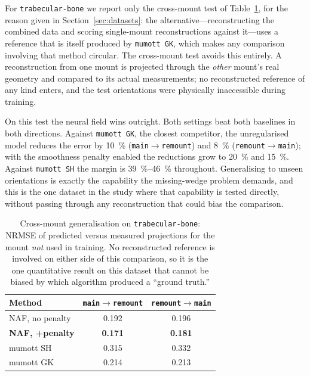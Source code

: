\documentclass[11pt,a4paper]{article}
\begin{document}
For \texttt{trabecular-bone} we report only the cross-mount test of Table~\ref{tab:crossmount}, for
the reason given in Section~\ref{sec:datasets}: the alternative---reconstructing the
combined data and scoring single-mount reconstructions against it---uses a reference that
is itself produced by \texttt{mumott GK}, which makes any comparison involving that method
circular. The cross-mount test avoids this entirely. A reconstruction from one mount is
projected through the \emph{other} mount's real geometry and compared to its actual
measurements; no reconstructed reference of any kind enters, and the test orientations were
physically inaccessible during training.

On this test the neural field wins outright. Both settings beat both baselines in both
directions. Against \texttt{mumott GK}, the closest competitor, the unregularised model
reduces the error by \SI{10}{\percent} (\texttt{main}$\rightarrow$\texttt{remount}) and
\SI{8}{\percent} (\texttt{remount}$\rightarrow$\texttt{main}); with the smoothness penalty
enabled the reductions grow to \SI{20}{\percent} and \SI{15}{\percent}. Against
\texttt{mumott SH} the margin is \SI{39}{\percent}--\SI{46}{\percent} throughout.
Generalising to unseen orientations is exactly the capability the missing-wedge problem
demands, and this is the one dataset in the study where that capability is tested directly,
without passing through any reconstruction that could bias the comparison.

\begin{table}[t]
\centering
\small
\caption{Cross-mount generalisation on \texttt{trabecular-bone}: NRMSE of predicted versus measured
projections for the mount \emph{not} used in training. No reconstructed reference is
involved on either side of this comparison, so it is the one quantitative result on this
dataset that cannot be biased by which algorithm produced a ``ground truth.''}
\label{tab:crossmount}
\begin{tabular}{@{}lcc@{}}
\toprule
Method & \texttt{main}$\rightarrow$\texttt{remount} & \texttt{remount}$\rightarrow$\texttt{main} \\
\midrule
NAF, no penalty        & 0.192 & 0.196 \\
\textbf{NAF, +penalty} & \textbf{0.171} & \textbf{0.181} \\
mumott SH              & 0.315 & 0.332 \\
mumott GK              & 0.214 & 0.213 \\
\bottomrule
\end{tabular}
\end{table}
\end{document}
